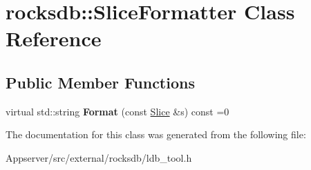 \hypertarget{classrocksdb_1_1SliceFormatter}{}\section{rocksdb\+:\+:Slice\+Formatter Class Reference}
\label{classrocksdb_1_1SliceFormatter}
\subsection*{Public Member Functions}
\begin{DoxyCompactItemize}
\item 
virtual std\+::string {\bfseries Format} (const \hyperlink{classrocksdb_1_1Slice}{Slice} \&s) const =0\hypertarget{classrocksdb_1_1SliceFormatter_a1c4bb312de914e08e99116c0c5e4c4da}{}\label{classrocksdb_1_1SliceFormatter_a1c4bb312de914e08e99116c0c5e4c4da}

\end{DoxyCompactItemize}


The documentation for this class was generated from the following file\+:\begin{DoxyCompactItemize}
\item 
Appserver/src/external/rocksdb/ldb\+\_\+tool.\+h\end{DoxyCompactItemize}
